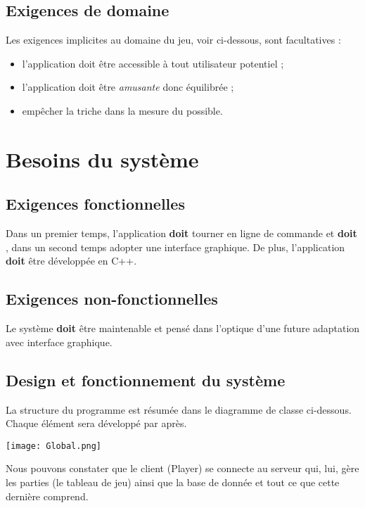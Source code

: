 \documentclass[12pt]{article}
\let\simplesection\section
\renewcommand{\section}{\clearpage\simplesection}
\let\simplesubsection\subsection
\renewcommand{\subsection}{
	\needspace{0.5\pagetotal}
	\simplesubsection
}
\newcommand{\doit}{\textbf{doit} }
\begin{document}
	\subsection{Exigences de domaine}
		Les exigences implicites au domaine du jeu, voir ci-dessous, sont facultatives :

		\begin{itemize}
			\item l'application doit être accessible à tout utilisateur potentiel ;
			\item l'application doit être \textit{amusante} donc équilibrée ;
			\item empêcher la triche dans la mesure du possible.
		\end{itemize}



\section{Besoins du système}
	\subsection{Exigences fonctionnelles}
		Dans un premier temps, l'application \doit tourner en ligne de commande et \doit, dans un second temps adopter une interface
		graphique.
		De plus, l'application \doit être développée en C++.

	\subsection{Exigences non-fonctionnelles}
		Le système \doit être maintenable et pensé dans l'optique d'une future adaptation avec interface graphique.

	\subsection{Design et fonctionnement du système}
		La structure du programme est résumée dans le diagramme de classe ci-dessous. Chaque élément sera développé par après.
		\begin{center}\texttt{[image: Global.png]}\end{center}

		Nous pouvons constater que le client (Player) se connecte au serveur qui, lui, gère les parties (le tableau de jeu) ainsi que la base de donnée et tout ce que cette dernière comprend.
\end{document}
